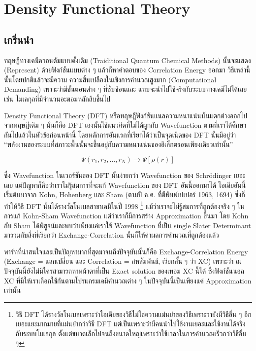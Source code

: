 
\chapter{Density Functional Theory}

\section{เกริ่นนำ}

ทฤษฎีทางเคมีควอนตัมแบบดั้งเดิม (Traiditional Quantum Chemical Methods) นั้นจะแสดง (Represent) 
ด้วยฟังก์ชันแบบต่าง ๆ แล้วก็หาคำตอบของ Correlation Energy ออกมา วิธีเหล่านี้นั้นโดยปกติแล้วจะมีความ%
ความสิ้นเปลืองในเชิงการคำนวณสูงมาก (Computational Demanding) เพราะว่ามีขั้นตอนต่าง ๆ ที่ซับซ้อนและ%
แทบจะนำไปใช้จริงกับระบบทางเคมีไม่ได้เลย เช่น โมเลกุลที่มีจำนวนอะตอมหลักสิบขึ้นไป

Density Functional Theory (DFT) หรือทฤษฎีฟังก์ชันแนลความหนาแน่นนั้นแตกต่างออกไปจากทฤษฎีเดิม ๆ 
นั่นก็คือ DFT เองนั้นใช้แนวคิดที่ไม่ได้ผูกกับ Wavefunction ตามที่เราได้ศึกษากันไปแล้วในหัวข้อก่อนหน้านี้ 
โดยหลักการอันแรกที่เรียกได้ว่าเป็นจุดเนิดของ DFT นั้นมีอยู่ว่า 
\enquote{พลังงานของระบบที่สภาวะพื้นนั้นจะขึ้นอยู่กับความหนาแน่นของอิเล็กตรอนเพียงเดียวเท่านั้น}

\begin{equation}
    \Psi(r_{1}, r_{2}, \dots, r_{N}) \rightarrow \Psi[\rho(r)]
\end{equation}

\noindent ซึ่ง Wavefunction ในเวอร์ชันของ DFT นั้นง่ายกว่า Wavefunction ของ Schr\"{o}dinger เยอะเลย
แต่ปัญหาก็คือว่าเราไม่รู้สมการที่จะแก้ Wavefunction ของ DFT อันนี้ออกมาได้ ไอเดียอันนี้เริ่มต้นมาจาก
Kohn, Hohenberg และ Sham (ตามปี ค.ศ. ที่ตีพิมพ์เปเปอร์ 1963, 1694) ซึ่งก็ทำให้วิธี
DFT นั้นได้รางวัลโนเบลสาขาเคมีในปี 1998%
\footnote{วิธี DFT ได้รางวัลโนเบลเพราะว่าไอเดียของวิธีไม่ใช่ความแม่นยำของวิธีเพราะว่ายังมีวิธีอื่น ๆ 
อีกเยอะแยะมากมายที่แม่นยำกว่าวิธี DFT แต่เป็นเพราะว่ามีคนนำไปใช้งานเยอะและใช้งานได้จริงกับระบบโมเลกุล%
ตั้งแต่ขนาดเล็กไปจนถึงขนาดใหญ่เพราะว่าใช้เวลาในการคำนวณเร็วกว่าวิธีอื่น ๆ} 
แม้ว่าเราจะไม่รู้สมการที่ถูกต้องจริง ๆ ในการแก้ Kohn-Sham Wavefunction แต่ว่าเราก็มีการสร้าง 
Approximation ขึ้นมา โดย Kohn กับ Sham ได้พิสูจน์และพบว่าเพียงแค่เราใช้ Wavefunction ที่เป็น 
single Slater Determinant มารวมกับสิ่งที่เรียกว่า Exchange-Correlation นั้นก็ให้ค่าผลการคำนวณที่ถูกต้องแล้ว

พาร์ทที่น่าสนใจและเป็นปัญหามากที่สุดมาจนถึงปัจจุบันนั้นก็คือ Exchange-Correlation Energy 
(Exchange = แลกเปลี่ยน และ Correlation = สหสัมพันธ์, เรียกสั้น ๆ ว่า XC)  เพราะว่า 
ณ ปัจจุบันนี้ยังไม่มีใครสามารถหาหน้าตาที่เป็น Exact solution ของเทอม XC นี้ได้ ซึ่งฟังก์ชันนอล XC 
ที่มีให้เราเลือกใช้กันตามโปรแกรมเคมีคำนวณต่าง ๆ ในปัจจุบันนี้เป็นเพียงแค่ Approximation เท่านั้น


